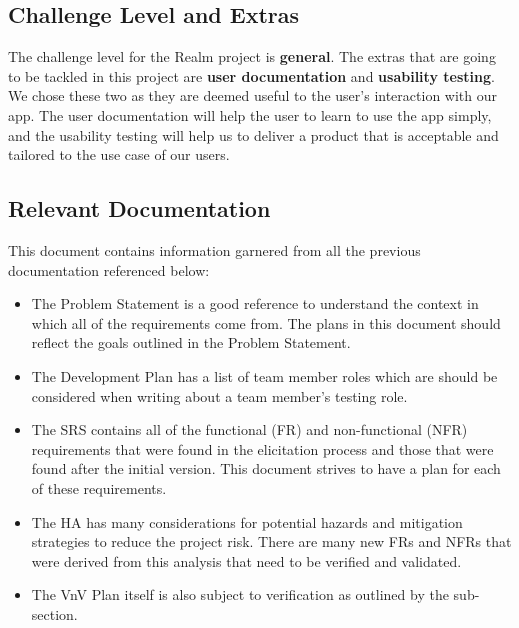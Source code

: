 \documentclass[12pt, titlepage]{article}
\begin{document}
\subsection{Challenge Level and Extras}

The challenge level for the Realm project is \textbf{general}. The extras that are going to be tackled in this project are \textbf{user documentation} and \textbf{usability testing}. We chose these two as they are deemed useful to the user's interaction with our app. The user documentation will help the user to learn to use the app simply, and the usability testing will help us to deliver a product that is acceptable and tailored to the use case of our users.
\subsection{Relevant Documentation}

This document contains information garnered from all the previous documentation referenced below:

\begingroup
\raggedright
\renewcommand{\refname}{}
\vspace{-3em}
\printbibliography
\endgroup

\begin{itemize}
  \item The Problem Statement \cite{ProblemStatement} is a good reference to understand the context in which all of the requirements come from. The plans in this document should reflect the goals outlined in the Problem Statement.
  \item The Development Plan \cite{DevelopmentPlan} has a list of team member roles which are should be considered when writing about a team member's testing role.
  \item The SRS \cite{SRS} contains all of the functional (FR) and non-functional (NFR) requirements that were found in the elicitation process and those that were found after the initial version. This document strives to have a plan for each of these requirements.
  \item The HA \cite{HA} has many considerations for potential hazards and mitigation strategies to reduce the project risk. There are many new FRs and NFRs that were derived from this analysis that need to be verified and validated.
  \item The VnV Plan \cite{VnV} itself is also subject to verification as outlined by the  sub-section.
\end{itemize}
\end{document}
